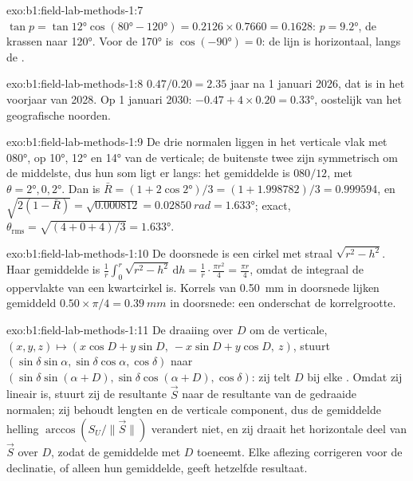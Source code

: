 \begin{solution}{exo:b1:field-lab-methods-1:7}
$\tan p = \tan\ang{12}\cos(\ang{80} - \ang{120}) = 0.2126\times0.7660 =
0.1628$: $p = \ang{9.2}$, de krassen  naar \ang{120}. Voor de  \ang{170} is
$\cos(\ang{-90}) = 0$: de lijn is horizontaal, langs de .
\end{solution}

\begin{solution}{exo:b1:field-lab-methods-1:8}
$0.47/0.20 = 2.35$ jaar na 1 januari 2026, dat is in het voorjaar van 2028. Op
1 januari 2030: $-0.47 + 4\times0.20 = \ang{+0.33}$, oostelijk van het geografische noorden.
\end{solution}

\begin{solution}{exo:b1:field-lab-methods-1:9}
De drie normalen liggen in het verticale vlak met  \ang{080}, op \ang{10}, \ang{12} en \ang{14} van de
verticale; de buitenste twee zijn symmetrisch om de middelste, dus hun som ligt er langs: het gemiddelde is
$080/12$, met $\theta = \ang{2}, 0, \ang{2}$. Dan is $\bar R = (1 +
2\cos\ang{2})/3 = (1 + 1.998782)/3 = 0.999594$, en $\sqrt{2(1 - \bar R)} =
\sqrt{0.000812} = \qty{0.02850}{rad} = \ang{1.633}$; exact,
$\theta_{\text{rms}} = \sqrt{(4 + 0 + 4)/3} = \ang{1.633}$.
\end{solution}

\begin{solution}{exo:b1:field-lab-methods-1:10}
De doorsnede is een cirkel met straal $\sqrt{r^2 - h^2}$. Haar gemiddelde is
$\frac1r\int_0^r\sqrt{r^2 - h^2}\,\mathrm dh = \frac1r\cdot\frac{\pi r^2}{4}
= \frac{\pi r}{4}$, omdat de integraal de oppervlakte van een kwartcirkel is. Korrels van
\qty{0.50}{mm} in doorsnede lijken gemiddeld $0.50\times\pi/4 = \qty{0.39}{mm}$ in doorsnede:
een  onderschat de korrelgrootte.
\end{solution}

\begin{solution}{exo:b1:field-lab-methods-1:11}
De draaiing over $D$ om de verticale,
$(x, y, z) \mapsto (x\cos D + y\sin D,\ -x\sin D + y\cos D,\ z)$, stuurt
$(\sin\delta\sin\alpha, \sin\delta\cos\alpha, \cos\delta)$ naar
$(\sin\delta\sin(\alpha + D), \sin\delta\cos(\alpha + D), \cos\delta)$: zij telt $D$ bij elke
. Omdat zij lineair is, stuurt zij de resultante $\vec S$ naar de resultante van de gedraaide normalen;
zij behoudt lengten en de verticale component, dus de gemiddelde helling $\arccos(S_U/\|\vec S\|)$ verandert niet, en zij
draait het horizontale deel van $\vec S$ over $D$, zodat de gemiddelde  met $D$ toeneemt. Elke aflezing
corrigeren voor de declinatie, of alleen hun gemiddelde, geeft hetzelfde resultaat.
\end{solution}

